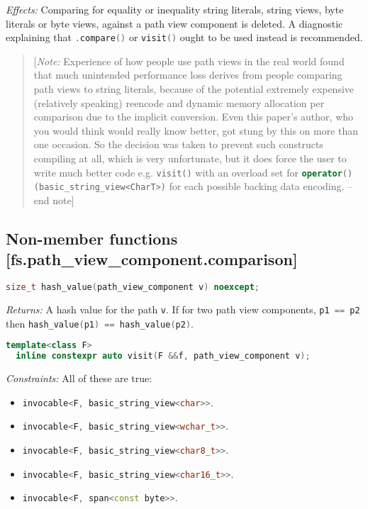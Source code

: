 \documentclass[11pt]{article}
\newcommand{\code}[2][cpp]{\lstinline[language=#1,basicstyle=\small\ttfamily]{#2}}
\newcommand{\desc}[1]{\textit{#1}}
\newcommand{\constraints}{\desc{Constraints: }}
\newcommand{\effects}{\desc{Effects: }}
\newcommand{\returns}{\desc{Returns: }}
\newcommand{\note}[1]{\begin{quote}[\textit{Note:} #1 -- end note]\end{quote}}
\begin{document}
\effects Comparing for equality or inequality string literals, string views, byte literals or byte views, against a path view component is deleted. A diagnostic explaining that \code{.compare()} or \code{visit()} ought to be used instead is recommended.

\color{black}

\note{Experience of how people use path views in the real world found that much unintended performance loss derives from people comparing path views to string literals, because of the potential extremely expensive (relatively speaking) reencode and dynamic memory allocation per comparison due to the implicit conversion. Even this paper's author, who you would think would really know better, got stung by this on more than one occasion. So the decision was taken to prevent such constructs compiling at all, which is very unfortunate, but it does force the user to write much better code e.g. \code{visit()} with an overload set for \code{operator()(basic_string_view<CharT>)} for each possible backing data encoding.}

\color{darkgreen}

\subsection*{Non-member functions [fs.path\_view\_component.comparison]}

\begin{lstlisting}[language=cpp]
  size_t hash_value(path_view_component v) noexcept;
\end{lstlisting}

\returns A hash value for the path \code{v}. If for two path view components, \code{p1 == p2} then \code{hash_value(p1) == hash_value(p2)}.\\

\begin{lstlisting}[language=cpp]
  template<class F>
  inline constexpr auto visit(F &&f, path_view_component v);
\end{lstlisting}

\constraints All of these are true:\begin{itemize}
    \item \code{invocable<F, basic_string_view<char>>}.
    \item \code{invocable<F, basic_string_view<wchar_t>>}.
    \item \code{invocable<F, basic_string_view<char8_t>>}.
    \item \code{invocable<F, basic_string_view<char16_t>>}.
    \item \code{invocable<F, span<const byte>>}.
\end{itemize}
\end{document}

